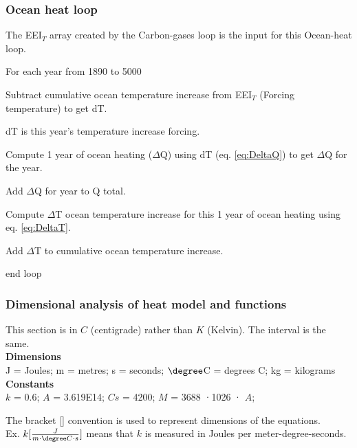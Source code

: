 \documentclass{article}
\begin{document}
\subsubsection{Ocean heat loop }

The EEI$_T$ array created by the Carbon-gases loop is the input for this Ocean-heat loop. 

\setlength{\parskip}{0pt} 

For each year from 1890 to 5000 

\qquad Subtract cumulative ocean temperature increase from EEI$_T$ (Forcing temperature) to get dT. 

\qquad \quad dT is this year's temperature increase forcing.

\qquad Compute 1 year of ocean heating ($\Delta$Q) using dT (eq. \ref{eq:DeltaQ}) to get $\Delta$Q for the year. 

\qquad Add $\Delta$Q for year to Q total. 

\qquad Compute $\Delta$T ocean temperature increase for this 1 year of ocean heating using eq. \ref{eq:DeltaT}. 

\qquad Add $\Delta$T to cumulative ocean temperature increase. 

end loop
\setlength{\parskip}{6pt}

\subsubsection{Dimensional analysis of heat model and functions}
This section is in $C$ (centigrade) rather than $K$ (Kelvin). The interval is the same. \\

\textbf{Dimensions} \\ J =  Joules; m =  metres; s = seconds; $\degree$C = degrees C; kg = kilograms   \\ 
\textbf{Constants} \\
$k$ = 0.6; $A$ = 3.619E14; $Cs$ = 4200; $M$ = 3688 ·1026 · $A$;  

The bracket [] convention is used to represent dimensions of the equations. \\
Ex. $k[\frac{J}{m \cdot \degree C \cdot s}]$ means that $k$ is measured in Joules per meter-degree-seconds.  \\
\end{document}
